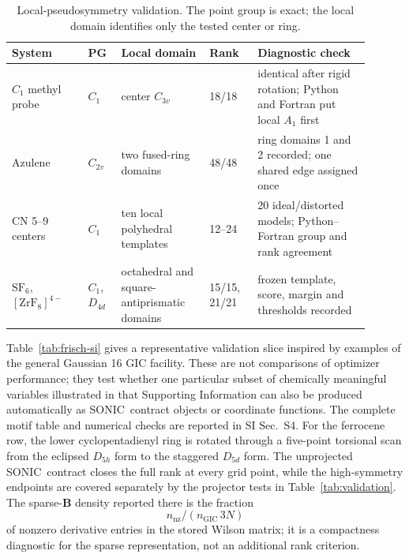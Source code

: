 \documentclass[journal=jctcce,manuscript=article,layout=traditional]{achemso}
\newcommand{\SONIC}{SONIC}
\newcommand{\Bmat}{\mathbf{B}}
\theoremstyle{definition}
\begin{document}
\begin{table}[htbp]
\centering
\scriptsize
\setlength{\tabcolsep}{3pt}
\caption{Local-pseudosymmetry validation.  The point group is exact; the local
domain identifies only the tested center or ring.}
\label{tab:local-salc-validation}
\begin{tabular}{@{}p{0.19\linewidth}p{0.08\linewidth}p{0.22\linewidth}p{0.12\linewidth}p{0.29\linewidth}@{}}
\toprule
System & PG & Local domain & Rank & Diagnostic check \\
\midrule
\(C_1\) methyl probe & \(C_1\) & center \(C_{3v}\) & 18/18 & identical after rigid rotation; Python and Fortran put local \(A_1\) first \\
\midrule
Azulene & \(C_{2v}\) & two fused-ring domains & 48/48 & ring domains 1 and 2 recorded; one shared edge assigned once \\
\midrule
CN 5--9 centers & \(C_1\) & ten local polyhedral templates & 12--24 & 20 ideal/distorted models; Python--Fortran group and rank agreement \\
\midrule
\(\mathrm{SF_6}\), \([\mathrm{ZrF_8}]^{4-}\) & \(C_1\), \(D_{4d}\) & octahedral and square-antiprismatic domains & 15/15, 21/21 & frozen template, score, margin and thresholds recorded \\
\bottomrule
\end{tabular}
\end{table}

Table~\ref{tab:frisch-si} gives a representative validation slice inspired by
examples of the general Gaussian 16 GIC facility.  These are not comparisons of
optimizer performance; they test whether one particular subset of chemically
meaningful variables illustrated in that Supporting Information can also be
produced automatically as \SONIC\ contract objects or coordinate functions.
The complete motif table and numerical checks are reported in SI Sec.~S4.
For the ferrocene row, the lower cyclopentadienyl ring is rotated through a
five-point torsional scan from the eclipsed \(D_{5h}\) form to the staggered
\(D_{5d}\) form.  The unprojected \SONIC\ contract closes the full rank at every
grid point, while the high-symmetry endpoints are covered separately by the
projector tests in Table~\ref{tab:validation}.  The sparse-\(\Bmat\) density
reported there is the fraction
\[
  n_{\mathrm{nz}}/(n_{\mathrm{GIC}}\,3N)
\]
of nonzero derivative entries in the stored Wilson matrix; it is a compactness
diagnostic for the sparse representation, not an additional rank criterion.
\end{document}
